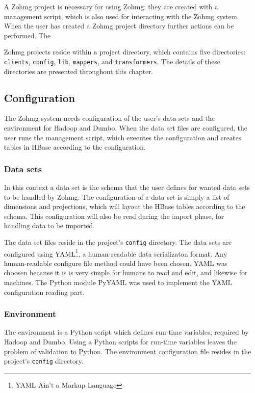 A Zohmg project is necessary for using Zohmg; they are created with a management
script, which is also used for interacting with the Zohmg system. When the user
has created a Zohmg project directory further actions can be performed.  The

Zohmg projects reside within a project directory, which contains five
directories: \texttt{clients}, \texttt{config}, \texttt{lib}, \texttt{mappers},
and \texttt{transformers}. The details of these directories are presented
throughout this chapter.


\subsection*{Configuration}

The Zohmg system needs configuration of the user's data sets and the environment
for Hadoop and Dumbo. When the data set files are configured, the user runs the
management script, which executes the configuration and creates tables in HBase
according to the configuration.


\subsubsection*{Data sets}


In this context a data set is the schema that the user defines for wanted data
sets to be handled by Zohmg. The configuration of a data set is simply a list
of dimensions and projections, which will layout the HBase tables according to
the schema. This configuration will also be read during the import phase, for
handling data to be imported.

The data set files reside in the project's \texttt{config} directory. The data
sets are configured using YAML\footnote{YAML Ain't a Markup Language}, a
human-readable data serializaton format. Any human-readable configure file
method could have been chosen. YAML was choosen because it is is very simple
for humans to read and edit, and likewise for machines. The Python module
PyYAML was used to implement the YAML configuration reading part. \cite{pyyaml}


\subsubsection*{Environment}

The environment is a Python script which defines run-time variables, required by
Hadoop and Dumbo. Using a Python scripts for run-time variables leaves the
problem of validation to Python. The environment configuration file resides in
the project's \texttt{config} directory.




